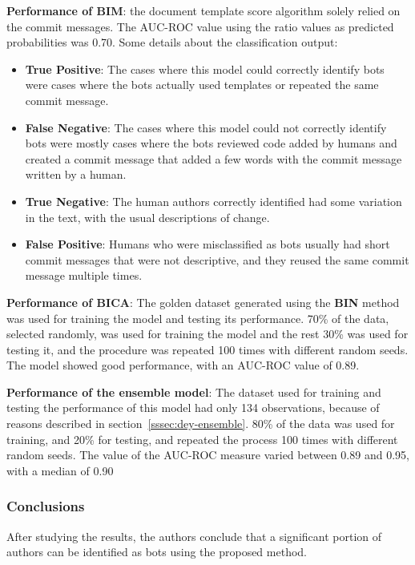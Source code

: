 \documentclass[a4paper, 12pt]{book}
\begin{document}
\textbf{Performance of BIM}: the document template score algorithm solely relied on the commit messages. The AUC-ROC value using the ratio values as predicted probabilities was 0.70. Some details about the classification output:
\begin{itemize}
	\item \textbf{True Positive}: The cases where this model could correctly identify
bots were cases where the bots actually used templates or repeated the same commit message. 
    \item \textbf{False Negative}: The cases where this model could not correctly identify bots were mostly cases where the bots reviewed code added by humans and created a commit message that added a few words with the commit message written by a human.
    \item \textbf{True Negative}: The human authors correctly identified had some variation in the text, with the usual descriptions of change.
    \item \textbf{False Positive}: Humans who were misclassified as bots usually had short commit messages that were not descriptive, and they reused the same commit message multiple times.
\end{itemize}

\textbf{Performance of BICA}: The golden dataset generated using the \textbf{BIN} method was used for training the model and testing its performance. 70\% of the data, selected randomly, was used for training the model and the rest 30\% was used for testing it, and the procedure was repeated 100 times with different random seeds. The model showed good performance, with an AUC-ROC value of 0.89.

\textbf{Performance of the ensemble model}: The dataset used for training and testing the performance of this model had only 134 observations, because of reasons described in section~\ref{sssec:dey-ensemble}. 80\% of the data was used for training, and 20\% for testing, and repeated the process 100 times with different random seeds. The value of the AUC-ROC measure varied between 0.89 and 0.95, with a median of 0.90

\subsubsection{Conclusions}
\label{sssec:dey-conclusions}

After studying the results, the authors conclude that a significant portion of authors can be identified as bots using the proposed method.
\end{document}
